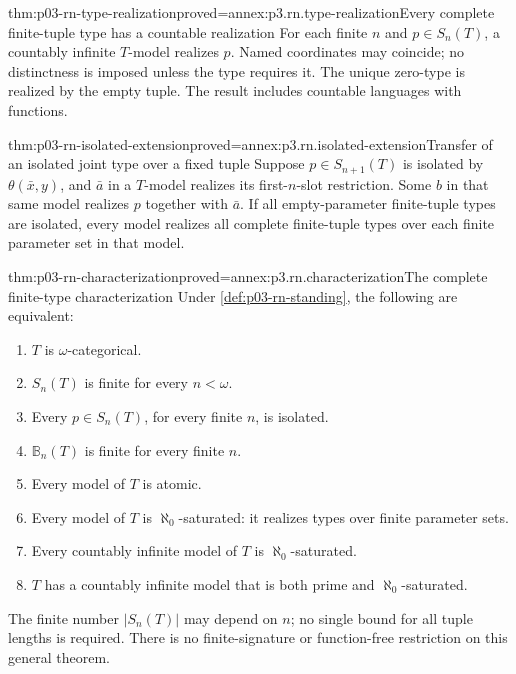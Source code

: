 \begin{hblemma}{thm:p03-rn-type-realization}{proved=annex:p3.rn.type-realization}{Every complete finite-tuple type has a countable realization}
For each finite \(n\) and \(p\in S_n(T)\), a countably infinite
\(T\)-model realizes \(p\).
Named coordinates may coincide; no distinctness is imposed unless
the type requires it. The unique zero-type is realized by the empty
tuple. The result includes countable languages with functions.
\end{hblemma}

\begin{hblemma}{thm:p03-rn-isolated-extension}{proved=annex:p3.rn.isolated-extension}{Transfer of an isolated joint type over a fixed tuple}
Suppose \(p\in S_{n+1}(T)\) is isolated by \(\theta(\bar x,y)\),
and \(\bar a\) in a \(T\)-model realizes its first-\(n\)-slot
restriction. Some \(b\) in that same model realizes \(p\)
together with \(\bar a\).
If all empty-parameter finite-tuple types are isolated, every
model realizes all complete finite-tuple types over each finite
parameter set in that model.
\end{hblemma}

\begin{hbtheorem}{thm:p03-rn-characterization}{proved=annex:p3.rn.characterization}{The complete finite-type characterization}
Under \cref{def:p03-rn-standing}, the following are equivalent:
\begin{enumerate}
\item \(T\) is \(\omega\)-categorical.
\item \(S_n(T)\) is finite for every \(n<\omega\).
\item Every \(p\in S_n(T)\), for every finite \(n\), is isolated.
\item \(\mathbb B_n(T)\) is finite for every finite \(n\).
\item Every model of \(T\) is atomic.
\item Every model of \(T\) is \(\aleph_0\)-saturated:
      it realizes types over finite parameter sets.
\item Every countably infinite model of \(T\) is
      \(\aleph_0\)-saturated.
\item \(T\) has a countably infinite model that is both prime
      and \(\aleph_0\)-saturated.
\end{enumerate}
The finite number \(|S_n(T)|\) may depend on \(n\);
no single bound for all tuple lengths is required.
There is no finite-signature or function-free restriction
on this general theorem.
\end{hbtheorem}

